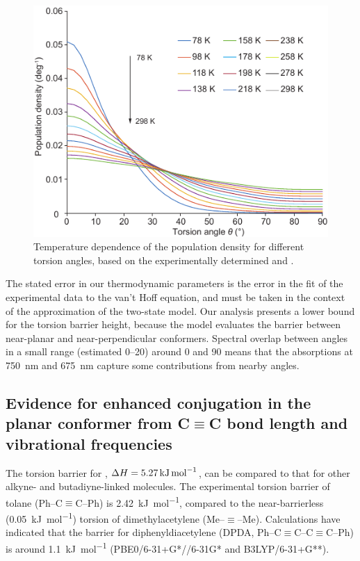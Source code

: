 		\begin{figure}[ht!]
			\centering\includegraphics{figures/dimer/Figure-8.pdf} 
			\caption[]{Temperature dependence of the population density for different torsion angles, based on the experimentally determined \delh and \dels.}
			\label{fig:dimer:f8}
		\end{figure}

		The stated error in our thermodynamic parameters is the error in the fit of the experimental data to the van't Hoff equation, and must be taken in the context of the approximation of the two-state model. Our analysis presents a lower bound for the torsion barrier height, because the model evaluates the barrier between near-planar and near-perpendicular conformers. Spectral overlap between angles in a small range (estimated 0–20\textdegree{}) around 0\textdegree{} and 90\textdegree{} means that the absorptions at \SI{750}{\nano\metre} and \SI{675}{\nano\metre} capture some contributions from nearby angles.
		\FloatBarrier
	\subsection{Evidence for enhanced conjugation in the planar conformer from C$\equiv$C bond length and vibrational frequencies}

		The torsion barrier for , $\Delta H = \SI{5.27}{\kilo\joule\per\mole}$, can be compared to that for other alkyne- and butadiyne-linked molecules. The experimental torsion barrier of tolane (Ph–C$\equiv$C–Ph) is \SI{2.42}{\kilo\joule\per\mole},\autocite{Okuyama1984} compared to the near-barrierless (\SI{0.05}{\kilo\joule\per\mole}) torsion of di\-methyl\-acetylene (Me–$\equiv$–Me).\autocite{Olson1971} Calculations have indicated that the barrier for diphenyldiacetylene (DPDA, Ph–C$\equiv$C–C$\equiv$C–Ph) is around \SI{1.1}{\kilo\joule\per\mole} (PBE0/6-31+G*//6-31G* and B3LYP/6-31+G**).\autocite{Thulstrup2011,Sebree2012} 

